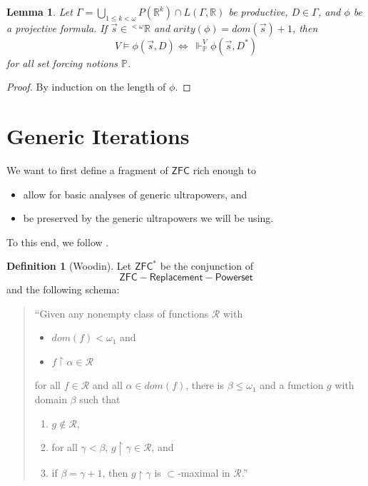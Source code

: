 \documentclass[12pt, twoside]{memoir}
\numberwithin{equation}{section}
\newtheorem{lem}[thm]{Lemma}
\theoremstyle{definition}
\newtheorem{defi}[thm]{Definition}
\theoremstyle{remark}
\theoremstyle{definition}
\theoremstyle{definition}
\theoremstyle{definition}
\theoremstyle{remark}
\begin{document}
\begin{lem}\label{prod}
Let $\Gamma  = \bigcup_{1 \leq k < \omega} P(\mathbb{R}^{k}) \cap L(\Gamma, \mathbb{R})$ be productive, $D \in \Gamma$, and $\phi$ be a projective formula. If $\Vec{s} \in {^{< \omega}{\mathbb{R}}}$ and $arity(\phi) = dom(\Vec{s}) + 1$, then 
\begin{equation*}
    V \models \phi(\Vec{s}, D) \iff \ \Vdash^V_{\mathbb{P}} \phi(\Vec{s}, D^*)
\end{equation*}
for all set forcing notions $\mathbb{P}$.
\end{lem}
\begin{proof}
By induction on the length of $\phi$.
\end{proof}

\section{Generic Iterations}

We want to first define a fragment of $\mathsf{ZFC}$ rich enough to 
\begin{itemize}
    \item allow for basic analyses of generic ultrapowers, and
    \item be preserved by the generic ultrapowers we will be using.
\end{itemize}
To this end, we follow \cite[Section 3.1]{woodin}.

\begin{defi}[Woodin]\label{nota1}
Let $\mathsf{ZFC}^*$ be the conjunction of $$\mathsf{ZFC} - \mathsf{Replacement} - \mathsf{Powerset}$$ and the following schema:
\begin{quote}
    ``Given any nonempty class of functions $\mathcal{R}$ with
    \begin{itemize}
        \item $dom(f) < \omega_1$ and
        \item $f \restriction \alpha \in \mathcal{R}$
    \end{itemize}
    for all $f \in \mathcal{R}$ and all $\alpha \in dom(f)$, there is $\beta \leq \omega_1$ and a function $g$ with domain $\beta$ such that
    \begin{enumerate}[label=(\alph*)]
        \item $g \not \in \mathcal{R}$,
        \item for all $\gamma < \beta$, $g \restriction \gamma \in \mathcal{R}$, and
        \item if $\beta = \gamma + 1$, then $g \restriction \gamma$ is $\subset$-maximal in $\mathcal{R}$.''
    \end{enumerate}
\end{quote}
\end{defi}
\end{document}
